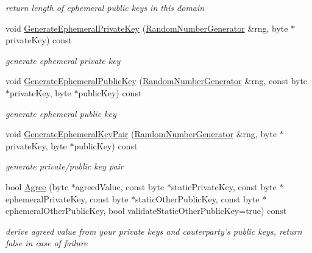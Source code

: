 \begin{DoxyCompactItemize}
\begin{DoxyCompactList}\small\item\em return length of ephemeral public keys in this domain \item\end{DoxyCompactList}\item 
void \hyperlink{class_d_h2_ab0e10e700f4461005b386a53ca37e7f8}{GenerateEphemeralPrivateKey} (\hyperlink{class_random_number_generator}{RandomNumberGenerator} \&rng, byte $\ast$privateKey) const 
\begin{DoxyCompactList}\small\item\em generate ephemeral private key \item\end{DoxyCompactList}\item 
void \hyperlink{class_d_h2_ab8f69e52f50794ca51774f671cfa45da}{GenerateEphemeralPublicKey} (\hyperlink{class_random_number_generator}{RandomNumberGenerator} \&rng, const byte $\ast$privateKey, byte $\ast$publicKey) const 
\begin{DoxyCompactList}\small\item\em generate ephemeral public key \item\end{DoxyCompactList}\item 
void \hyperlink{class_d_h2_a4b5a84bf47e9a18348521b5a9c752cce}{GenerateEphemeralKeyPair} (\hyperlink{class_random_number_generator}{RandomNumberGenerator} \&rng, byte $\ast$privateKey, byte $\ast$publicKey) const 
\begin{DoxyCompactList}\small\item\em generate private/public key pair \item\end{DoxyCompactList}\item 
bool \hyperlink{class_d_h2_a561ed549ab2f287bd5f72be06e217290}{Agree} (byte $\ast$agreedValue, const byte $\ast$staticPrivateKey, const byte $\ast$ephemeralPrivateKey, const byte $\ast$staticOtherPublicKey, const byte $\ast$ephemeralOtherPublicKey, bool validateStaticOtherPublicKey=true) const 
\begin{DoxyCompactList}\small\item\em derive agreed value from your private keys and couterparty's public keys, return false in case of failure \item\end{DoxyCompactList}\end{DoxyCompactItemize}
